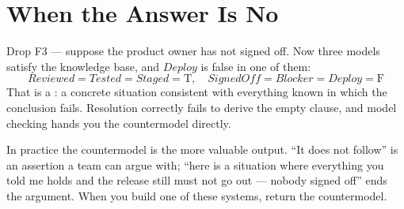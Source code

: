 \section{When the Answer Is No}

Drop F3 --- suppose the product owner has not signed off. Now three models satisfy
the knowledge base, and $\mathit{Deploy}$ is false in one of them:
\[
  \mathit{Reviewed} = \mathit{Tested} = \mathit{Staged} = \text{T},\quad
  \mathit{SignedOff} = \mathit{Blocker} = \mathit{Deploy} = \text{F}
\]
That is a : a concrete situation consistent with everything known
in which the conclusion fails. Resolution correctly fails to derive the empty
clause, and model checking hands you the countermodel directly.

In practice the countermodel is the more valuable output. ``It does not follow'' is
an assertion a team can argue with; ``here is a situation where everything you told
me holds and the release still must not go out --- nobody signed off'' ends the
argument. When you build one of these systems, return the countermodel.

